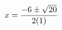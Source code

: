 \documentclass[preview]{standalone}
\begin{document}
\begin{align*}
\special{dvisvgm:raw <g id='unique000'>}x=\frac{-6\pm\sqrt{20}}{2(1)}\special{dvisvgm:raw </g>}
\end{align*}
\end{document}
